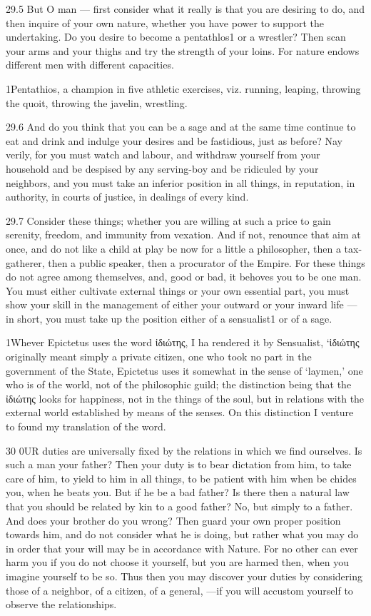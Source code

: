    29.5   But O man —  first consider what it really is that you are desiring to do, and then inquire of your own nature, whether you have power to support the undertaking. Do you desire to become a pentathlos1 or a wrestler? Then scan your arms and your thighs and try the strength of your loins. For nature endows different men with different capacities.

   1Pentathios, a champion in five athletic exercises, viz. running, leaping, throwing the quoit, throwing the javelin, wrestling.

   29.6    And do you think that you can be a sage and at the same time continue to eat and drink and indulge your desires and be fastidious, just as before? Nay verily, for you must watch and labour, and withdraw yourself from your household and be despised by any serving-boy and be ridiculed by your neighbors, and you must take an inferior position in all things, in reputation, in authority, in courts of justice, in dealings of every kind.

   29.7   Consider these things; whether you are willing at such a price to gain serenity, freedom, and immunity from vexation. And if not, renounce that aim at once, and do not like a child at play be now for a little a philosopher, then a tax-gatherer, then a public speaker, then a procurator of the Empire.  For these things do not agree among themselves, and, good or bad, it behoves you to be one man. You must either cultivate external things or your own essential part, you must show your skill in the management of either your outward or your inward life — in short, you must take up the position either of a sensualist1 or of a sage.

   1Whever Epictetus uses the word ἰδιώτης, I ha rendered it by Sensualist, ‘ἰδιώτης originally meant simply a private citizen, one who took no part in the government of the State, Epictetus uses it somewhat in the sense of ‘laymen,’ one who is of the world, not of the philosophic guild; the distinction being that the ἰδιώτης  looks for happiness, not in the things of the soul, but in relations with the external world established by means of the senses. On this distinction I venture to found my translation of the word.

   30   0UR duties are universally fixed by the relations in which we find ourselves.  Is such a man your father? Then your duty is to bear dictation from him, to take care of him, to yield to him in all things, to be patient with him when be chides you, when he beats you. But if he be a bad father?  Is there then a natural law that you should be related by kin to a good father? No, but simply to a father.  And does your brother do you wrong? Then guard your own proper position towards him, and do not consider what he is doing, but rather what you may do in order that your will may be in accordance with Nature. For no other can ever harm you if you do not choose it yourself, but you are harmed then, when you imagine yourself to be so. Thus then you may discover your duties by considering those of a neighbor, of a citizen, of a general, —if you will accustom yourself to observe the relationships.

